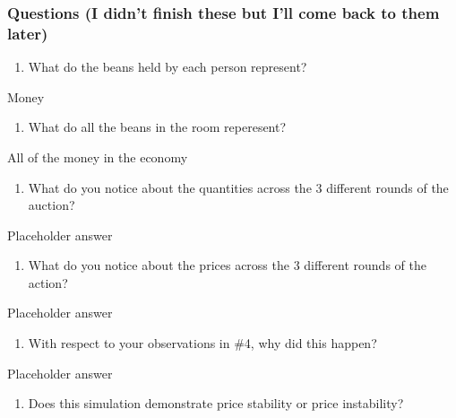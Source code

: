 \documentclass[
  letterpaper,
  DIV=11,
  numbers=noendperiod]{scrartcl}
\providecommand{\tightlist}{%
  \setlength{\itemsep}{0pt}\setlength{\parskip}{0pt}}\usepackage{longtable,booktabs,array}
\begin{document}
\subsubsection{Questions (I didn't finish these but I'll come back to
them
later)}\label{questions-i-didnt-finish-these-but-ill-come-back-to-them-later}

\begin{enumerate}
\def\labelenumi{\arabic{enumi}.}
\tightlist
\item
  What do the beans held by each person represent?
\end{enumerate}

Money

\begin{enumerate}
\def\labelenumi{\arabic{enumi}.}
\setcounter{enumi}{1}
\tightlist
\item
  What do all the beans in the room reperesent?
\end{enumerate}

All of the money in the economy

\begin{enumerate}
\def\labelenumi{\arabic{enumi}.}
\setcounter{enumi}{2}
\tightlist
\item
  What do you notice about the quantities across the 3 different rounds
  of the auction?
\end{enumerate}

Placeholder answer

\begin{enumerate}
\def\labelenumi{\arabic{enumi}.}
\setcounter{enumi}{3}
\tightlist
\item
  What do you notice about the prices across the 3 different rounds of
  the action?
\end{enumerate}

Placeholder answer

\begin{enumerate}
\def\labelenumi{\arabic{enumi}.}
\setcounter{enumi}{4}
\tightlist
\item
  With respect to your observations in \#4, why did this happen?
\end{enumerate}

Placeholder answer

\begin{enumerate}
\def\labelenumi{\arabic{enumi}.}
\setcounter{enumi}{5}
\tightlist
\item
  Does this simulation demonstrate price stability or price instability?
\end{enumerate}
\end{document}
